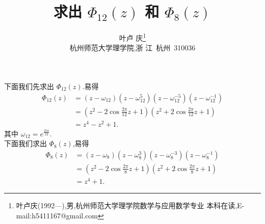 \documentclass[a4paper]{article}
\begin{document}
\title{\huge{\bf{求出 $\Phi_{12}(z)$ 和 $\Phi_8(z)$}}} \author{\small{叶卢
    庆\footnote{叶卢庆(1992---),男,杭州师范大学理学院数学与应用数学专业
      本科在读,E-mail:h5411167@gmail.com}}\\{\small{杭州师范大学理学院,浙
      江~杭州~310036}}}
\maketitle
下面我们先求出 $\Phi_{12}(z)$.易得
\begin{align*}
\Phi_{12}(z)&=(z-\omega_{12})(z-\omega_{12}^5)(z-\omega_{12}^{-5})(z-\omega_{12}^{-1})\\&=(z^2-2\cos
\frac{2\pi}{12}z+1)(z^2+2\cos \frac{2\pi}{12}z+1)\\&=z^4-z^2+1.
\end{align*}
其中 $\omega_{12}=e^{\frac{2\pi i}{12}}$.\\

下面我们求出 $\Phi_8(z)$,易得
\begin{align*}
  \Phi_8(z)&=(z-\omega_8)(z-\omega_8^3)(z-\omega_8^{-3})(z-\omega_8^{-1})\\&=(z^2-2\cos
  \frac{2\pi}{8}z+1)(z^2+2\cos \frac{2\pi}{8}z+1)\\&=z^4+1.
\end{align*}
\end{document}

